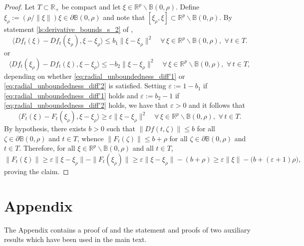 \documentclass[a4paper,11pt]{article}
\newcommand{\B}{\mathbb B}
\newcommand{\R}{\mathbb R}
\numberwithin{equation}{section}
\numberwithin{figure}{section}
\numberwithin{table}{section}
\begin{document}
%
\begin{proof} Let $T\subset\R_+$ be compact and let $\xi\in\R^p\backslash\B(0,\rho)$. Define $\xi_\rho:=(\rho/\|\xi\|)\xi
\in\partial\B(0,\rho)$ and note that $[\xi_\rho,\xi]\subset\R^p\backslash\B(0,\rho)$.
By statement \ref{ls:derivative_bounds_s_2} of ,
\[
\langle Df_t(\xi)-Df_t(\xi_\rho),\xi-\xi_\rho\rangle\leq b_1\|\xi-\xi_\rho\|^2\quad
\forall\,\xi\in\R^p\backslash\B(0,\rho),\,\,\forall\,t\in T.
\]
or
\[
\langle Df_t(\xi_\rho)-Df_t(\xi),\xi-\xi_\rho\rangle\leq -b_2\|\xi-\xi_\rho\|^2\quad
\forall\,\xi\in\R^p\backslash\B(0,\rho),\,\,\forall\,t\in T,
\]
depending on whether \eqref{eq:radial_unboundedness_diff'1} or \eqref{eq:radial_unboundedness_diff'2} is satisfied. Setting $\varepsilon:=
1-b_1$ if \eqref{eq:radial_unboundedness_diff'1} holds and  $\varepsilon:=b_2-1$  if \eqref{eq:radial_unboundedness_diff'2} holds, we have that $\varepsilon>0$ and it follows that
\[
\langle F_t(\xi)-F_t(\xi_\rho),\xi-\xi_\rho\rangle\geq\varepsilon\|\xi-\xi_\rho\|^2\quad
\forall\,\xi\in\R^p\backslash\B(0,\rho),\,\,\forall\,t\in T.
\]
By hypothesis, there exists $b>0$ such that $\|Df(t,\zeta)\|\leq b$ for all $\zeta\in \partial\B(0,\rho)$ and $t\in T$, whence $\|F_t(\zeta)\|\leq b+\rho$ for all $\zeta\in\partial\B(0,\rho)$ and $t\in T$. Therefore, for all $\xi\in\R^p\backslash\B(0,\rho)$ and all $t\in T$,
\[
\|F_t(\xi)\|\geq\varepsilon\|\xi-\xi_\rho\|-\|F_t(\xi_\rho)\|
\geq\varepsilon\|\xi-\xi_\rho\|-(b+\rho)
\geq\varepsilon\|\xi\|-\big(b+(\varepsilon+1)\rho\big),
\]
proving the claim.
\end{proof}
%
%
%
%
\appendix
\section{Appendix}
%
The Appendix contains a proof of  and the statement and proofs of two auxiliary results which have been used in the main text.
%
\end{document}
